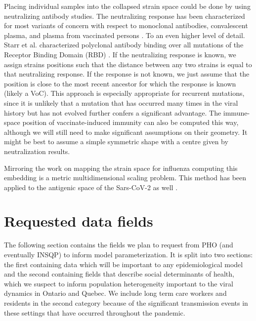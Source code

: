 \documentclass{article}
\begin{document}
Placing individual samples into the collapsed strain space could be done by using neutralizing antibody studies. The neutralizing response has been characterized for most variants of concern with respect to monoclonal antibodies, convalescent plasma, and plasma from vaccinated persons \cite{stanford2020}. To an even higher level of detail. Starr et al. characterized polyclonal antibody binding over all mutations of the Receptor Binding Domain (RBD) \cite{starr2020deep}. If the neutralizing response is known, we assign strains positions such that the distance between any two strains is equal to that neutralizing response. If the response is not known, we just assume that the position is close to the most recent ancestor for which the response is known (likely a VoC). This approach is especially appropriate for recurrent mutations, since it is unlikely that a mutation that has occurred many times in the viral history but has not evolved further confers a significant advantage. The immune-space position of vaccinate-induced immunity can also be computed this way, although we will still need to make significant assumptions on their geometry. It might be best to assume a simple symmetric shape with a centre given by neutralization results. 

Mirroring the work on mapping the strain space for influenza \cite{lapedesGeometryShapeSpace2001, smithMappingAntigenicGenetic2004, cai2010computational} computing this embedding is a metric multidimensional scaling problem. This method has been applied to the antigenic space of the Sars-CoV-2 as well \cite{millerAntigenicSpaceFramework2021, wilksMappingSARSCoV2Antigenic2022}. 

\newpage
\clearpage
\section{Requested data fields}
\label{data_fields}

The following section contains the fields we plan to request from PHO (and eventually INSQP) to inform model parameterization. It is split into two sections: the first containing data which will be important to any epidemiological model and the second containing fields that describe social determinants of health, which we suspect to inform population heterogeneity important to the viral dynamics in Ontario and Quebec. We include long term care workers and residents in the second category because of the significant transmission events in these settings that have occurred throughout the pandemic.
\end{document}
